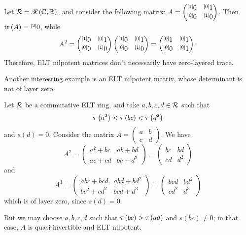\begin{example}
Let $\R=\ELT{\mathbb{R}}{\mathbb{C}}$, and consider the following matrix: $\displaystyle{A=\begin{pmatrix}\layer{0}{1} & \layer{1}{0}\\
\layer{0}{0} & \layer{0}{1}
\end{pmatrix}}$.
Then $\tr\left(A\right)=\layer{0}{2}$, while
$$A^{2}=\begin{pmatrix}\layer{0}{1} & \layer{1}{0}\\
\layer{0}{0} & \layer{0}{1}
\end{pmatrix}\begin{pmatrix}\layer{0}{1} & \layer{1}{0}\\
\layer{0}{0} & \layer{0}{1}
\end{pmatrix}=\begin{pmatrix}\layer{1}{0} & \layer{1}{0}\\
\layer{0}{0} & \layer{1}{0}
\end{pmatrix}.$$
Therefore, ELT nilpotent matrices don't necessarily  have zero-layered trace.
\end{example}

Another interesting example is an ELT nilpotent matrix, whose determinant is not of layer zero.
\begin{example}
Let $\R$ be a commutative ELT ring, and take $a,b,c,d\in\R$ such that
$$\t\left(a^2\right)<\t\left(bc\right)<\t\left(d^2\right)$$
and $s\left(d\right)=0$. Consider the matrix $\displaystyle{A=\begin{pmatrix}a&b\\c&d\end{pmatrix}}$. We have
$$A^2=\begin{pmatrix}a^2+bc&ab+bd\\ac+cd&bc+d^2\end{pmatrix}=\begin{pmatrix}bc&bd\\cd&d^2\end{pmatrix}$$
and
$$A^3=\begin{pmatrix}abc+bcd&abd+bd^2\\bc^2+cd^2&bcd+d^3\end{pmatrix}=\begin{pmatrix}bcd&bd^2\\cd^2&d^3\end{pmatrix}$$
which is of layer zero, since $s\left(d\right)=0$.

But we may choose $a,b,c,d$ such that $\t\left(bc\right)>\t\left(ad\right)$ and $s\left(bc\right)\neq0$; in that case, $A$ is quasi-invertible and ELT nilpotent.
\end{example}


